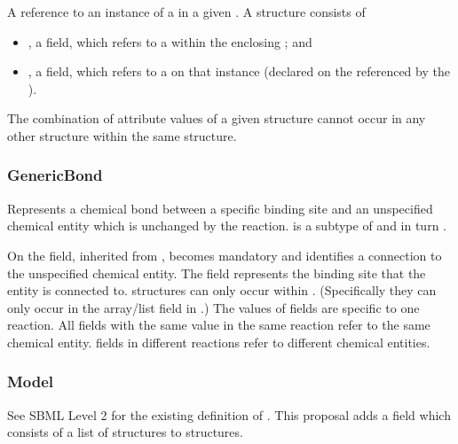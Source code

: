 \documentclass{cekarticle}
\begin{document}
A reference to an instance of a  in a given .
A  structure consists of

\begin{itemize}

\item {}, a  field,
which refers to a  within the enclosing
; and

\item {}, a  field, which refers to a 
on that instance (declared on the  referenced by the
).

\end{itemize}

The combination of attribute values of a given  structure cannot
occur in any other  structure within the same 
structure.  

\subsubsection{GenericBond}

Represents a chemical bond between a specific binding site and an unspecified chemical entity which is
unchanged by the reaction.
 is a subtype of  and in turn .

On  the  field, inherited from , becomes mandatory and
identifies a connection to the unspecified chemical entity.
The  field represents the binding site that the entity
is connected to.
 structures can only occur within .
(Specifically they can only occur
in the  array/list field in .)
The values of   fields are specific to one reaction. 
All  
fields with the same value in the same reaction refer to the same chemical entity.
  fields in different reactions refer to different chemical entities.

\subsubsection{Model}

See SBML Level 2 for the existing definition of .  This proposal adds a
 field which consists of a list of  structures to
 structures.  
\end{document}
